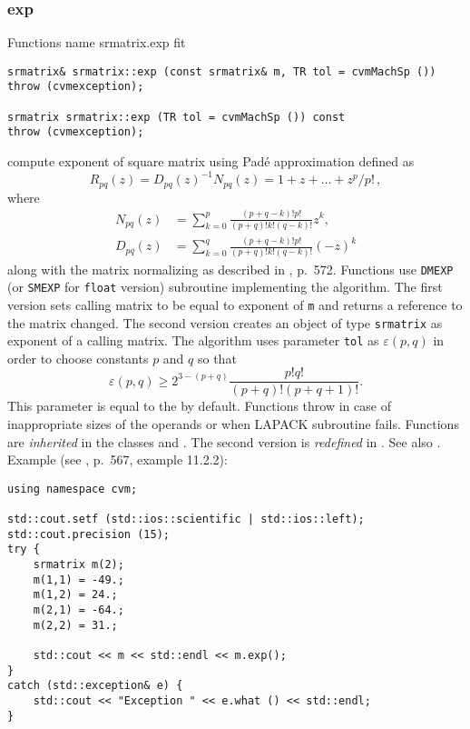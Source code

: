 \subsubsection{exp}
Functions%
\pdfdest name {srmatrix.exp} fit
\begin{verbatim}
srmatrix& srmatrix::exp (const srmatrix& m, TR tol = cvmMachSp ())
throw (cvmexception);

srmatrix srmatrix::exp (TR tol = cvmMachSp ()) const
throw (cvmexception);
\end{verbatim}
compute exponent of square matrix using Pad\'e approximation
defined as
\begin{equation*}
R_{pq}(z)=D_{pq}(z)^{-1}N_{pq}(z)=1+z+\dots+z^p/p!\,,
\end{equation*}
where
\begin{align*}
N_{pq}(z)&=\sum_{k=0}^p\frac{(p+q-k)!p!}{(p+q)!k!(q-k)!}z^k,\\
D_{pq}(z)&=\sum_{k=0}^q\frac{(p+q-k)!p!}{(p+q)!k!(q-k)!}(-z)^k
\end{align*}
along with the matrix normalizing as described in
, p.~572.
Functions use \verb"DMEXP" (or \verb"SMEXP" for \verb"float" version)
\FORTRAN subroutine implementing the algorithm.
The first version sets calling matrix to be equal to
exponent of \verb"m" and returns a reference to the matrix
changed. The second version
creates an object of type \verb"srmatrix" as 
exponent of a calling matrix.
The algorithm uses parameter \verb"tol"
as $\varepsilon(p,q)$ in order to choose constants $p$ and $q$
so that
\begin{equation*}
\varepsilon(p,q)\ge 2^{3-(p+q)}\frac{p!q!}{(p+q)!(p+q+1)!}.
\end{equation*}
This parameter is equal to the
 by default.
Functions throw   
in case of
inappropriate sizes of the operands or when LAPACK subroutine fails.
Functions are \emph{inherited} in the classes
and . The second version
is \emph{redefined} in .
See also
.
Example (see , p.~567,
example 11.2.2):
\begin{Verbatim}
using namespace cvm;

std::cout.setf (std::ios::scientific | std::ios::left); 
std::cout.precision (15);
try {
    srmatrix m(2);
    m(1,1) = -49.;
    m(1,2) = 24.;
    m(2,1) = -64.;
    m(2,2) = 31.;

    std::cout << m << std::endl << m.exp();
}
catch (std::exception& e) {
    std::cout << "Exception " << e.what () << std::endl;
}
\end{Verbatim}
